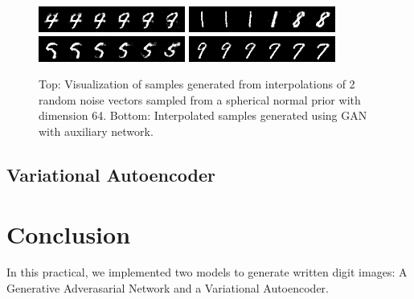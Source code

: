 \documentclass[11pt]{article}
\begin{document}
\begin{figure}[H]
	\begin{center}
		\includegraphics[scale=0.5]{interp_fake_images-1}
		\includegraphics[scale=0.5]{interp_fake_images-2} \\
		\includegraphics[scale=0.5]{interp_fake_images-1-mod}
		\includegraphics[scale=0.5]{interp_fake_images-2-mod}
		\label{fig:gan-vis}
		\caption{Top: Visualization of samples generated from interpolations of 2 random noise vectors sampled from a spherical normal prior with dimension 64. Bottom: Interpolated samples generated using GAN with auxiliary network.}
	\end{center} 
\end{figure}

\subsection{Variational Autoencoder} 

\section{Conclusion}
In this practical, we implemented two models to generate written digit images: A Generative Adverasarial Network and a Variational Autoencoder.



\nocite{*}

\end{document}
